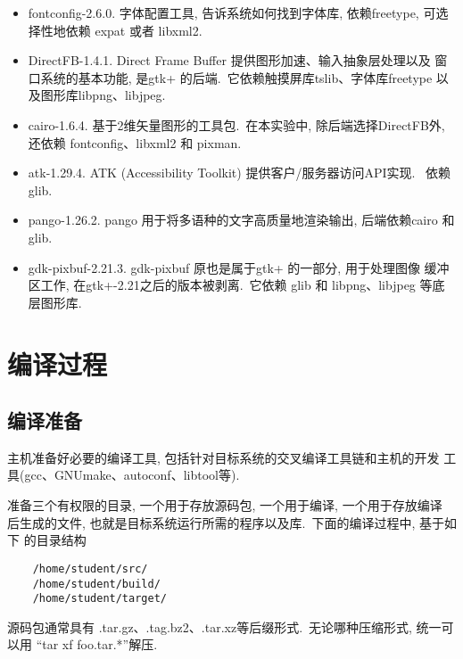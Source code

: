 \begin{itemize}
  \item fontconfig-2.6.0. 字体配置工具, 告诉系统如何找到字体库, 依赖freetype,
      可选择性地依赖 expat 或者 libxml2.

  \item DirectFB-1.4.1. Direct Frame Buffer 提供图形加速、输入抽象层处理以及
      窗口系统的基本功能, 是gtk+ 的后端.~它依赖触摸屏库tslib、字体库freetype
      以及图形库libpng、libjpeg.

  \item cairo-1.6.4. 基于2维矢量图形的工具包.~在本实验中, 除后端选择DirectFB外,
      还依赖 fontconfig、libxml2 和 pixman.
  \item atk-1.29.4. ATK (Accessibility Toolkit) 提供客户/服务器访问API实现.
      ~依赖 glib.

  \item pango-1.26.2. pango 用于将多语种的文字高质量地渲染输出, 后端依赖cairo
      和glib.

  \item gdk-pixbuf-2.21.3. gdk-pixbuf 原也是属于gtk+ 的一部分, 用于处理图像
      缓冲区工作, 在gtk+-2.21之后的版本被剥离.~它依赖 glib 和 libpng、libjpeg
      等底层图形库.
\end{itemize}

\section{编译过程}
\subsection{编译准备}
    主机准备好必要的编译工具, 包括针对目标系统的交叉编译工具链和主机的开发
工具(gcc、GNUmake、autoconf、libtool等).

    准备三个有权限的目录, 一个用于存放源码包, 一个用于编译, 一个用于存放编译
后生成的文件, 也就是目标系统运行所需的程序以及库.~下面的编译过程中, 基于如下
的目录结构

\begin{verbatim}
    /home/student/src/
    /home/student/build/
    /home/student/target/
\end{verbatim}

    源码包通常具有 .tar.gz、.tag.bz2、.tar.xz等后缀形式.~无论哪种压缩形式,
统一可以用 ``tar xf foo.tar.*''解压.

